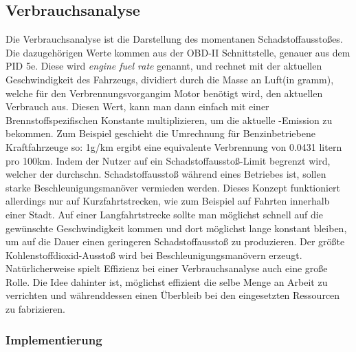 \subsection{Verbrauchsanalyse}

Die Verbrauchsanalyse ist die Darstellung des momentanen Schadstoffausstoßes.
Die dazugehörigen Werte kommen aus der OBD-II Schnittstelle, genauer aus dem PID 5e.
Diese wird \textit{engine fuel rate} genannt, und rechnet mit der 
aktuellen Geschwindigkeit des Fahrzeugs, dividiert durch die Masse an Luft(in gramm), 
welche für den Verbrennungsvorgangim Motor benötigt wird,
den aktuellen Verbrauch aus. Diesen Wert, kann man dann einfach mit einer Brennstoffspezifischen
Konstante multiplizieren, um die aktuelle -Emission zu bekommen.
Zum Beispiel geschieht die Umrechnung für Benzinbetriebene Kraftfahrzeuge so:
1g/km  ergibt eine equivalente Verbrennung von 0.0431 litern pro 100km. 
Indem der Nutzer auf ein Schadstoffausstoß-Limit begrenzt wird, welcher der durchschn.
Schadstoffausstoß während eines Betriebes ist, sollen starke Beschleunigungsmanöver 
vermieden werden. Dieses Konzept funktioniert allerdings nur auf Kurzfahrtstrecken,
wie zum Beispiel auf Fahrten innerhalb einer Stadt.
Auf einer Langfahrtstrecke sollte man möglichst schnell auf die gewünschte Geschwindigkeit kommen
und dort möglichst lange konstant bleiben, um auf die Dauer einen geringeren Schadstoffausstoß zu produzieren.
Der größte Kohlenstoffdioxid-Ausstoß wird bei Beschleunigungsmanövern erzeugt.
Natürlicherweise spielt Effizienz bei einer Verbrauchsanalyse auch eine große Rolle.
Die Idee dahinter ist, möglichst effizient die selbe Menge an Arbeit zu verrichten und währenddessen einen Überbleib
bei den eingesetzten Ressourcen zu fabrizieren. 




\subsubsection{Implementierung}

